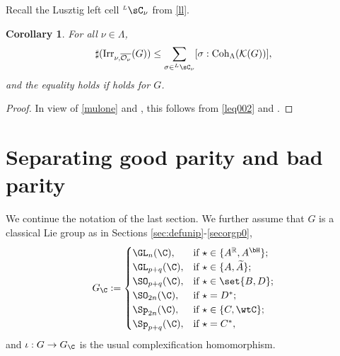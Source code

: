\documentclass[12pt,a4paper]{amsart}
\def\subset{\subseteq}
\newcommand{\CK}{{\mathcal {K}}}
\newcommand{\CO}{{\mathcal {O}}}
\newcommand{\g}{\mathfrak g}
\newcommand{\R}{\mathbb R}
\newcommand{\be}{\begin {equation}}
\newcommand{\ee}{\end {equation}}
\numberwithin{equation}{section}
\newtheorem{cor}[thm]{Corollary}
\theoremstyle{remark}
\def\Irr{\mathrm{Irr}}
\def\LC{{}^{\scriptscriptstyle L}\sC}
\def\Coh{\mathrm{Coh}}
\newcommand{\Lam}{{[\lambda]}}
\begin{document}

Recall the Lusztig left cell
$\LC_{\nu}$ from \eqref{ll}.




 \begin{cor}\label{counteq}
   For  all $\nu\in \Lambda$,
  \begin{equation*}%
    \sharp(\Irr_{\nu,\overline{\CO_{\nu}}}(G)) \leq \sum_{\sigma \in \LC_{\nu}}   [\sigma:\Coh_{\Lambda}(\CK(G))],
  \end{equation*}
     and the equality holds if   holds for $G$.
    \end{cor}
  \begin{proof}
 In view of \eqref{mulone} and , this follows from \eqref{leq002} and .
  \end{proof}


\section{Separating good parity and bad parity}


We continue the notation of the last section. We further assume that $G$ is a classical Lie group as in Sections \ref{sec:defunip}-\ref{secorgp0},
\be\label{gc}
  G_\C :=
  \begin{cases}
   \GL_{n}(\C), & \textrm{if $\star\in \{A^\R, A^\bH\}$};\\
     \GL_{p+q}(\C), & \textrm{if $\star\in \{A, \widetilde A\}$};\\
    \SO_{p+q}(\C), & \textrm{if $\star\in \set{B,D}$};\\
    \SO_{2n}(\C), &\textrm{if $\star = D^{*}$};\\
    \Sp_{2n}(\C), &\textrm{if $\star \in \{C, \wtC\}$};\\
    \Sp_{p+q}(\C), &\textrm{if $\star = C^{*}$},\\
  \end{cases}
\ee
and $\iota: G\rightarrow G_\C$ is the usual complexification homomorphism.
\end{document}
